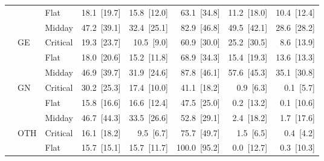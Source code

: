 \begin{tabular}{l l l r r r r r}
 &  & Flat & 18.1~{\color{seasoncol}\scriptsize[19.7]} & 15.8~{\color{seasoncol}\scriptsize[12.0]} & 63.1~{\color{seasoncol}\scriptsize[34.8]} & 11.2~{\color{seasoncol}\scriptsize[18.0]} & 10.4~{\color{seasoncol}\scriptsize[12.4]} \\
 &  & Midday & 47.2~{\color{seasoncol}\scriptsize[39.1]} & 32.4~{\color{seasoncol}\scriptsize[25.1]} & 82.9~{\color{seasoncol}\scriptsize[46.8]} & 49.5~{\color{seasoncol}\scriptsize[42.1]} & 28.6~{\color{seasoncol}\scriptsize[28.2]} \\
 & GE & Critical & 19.3~{\color{seasoncol}\scriptsize[23.7]} & 10.5~{\color{seasoncol}\scriptsize[9.0]} & 60.9~{\color{seasoncol}\scriptsize[30.0]} & 25.2~{\color{seasoncol}\scriptsize[30.5]} & 8.6~{\color{seasoncol}\scriptsize[13.9]} \\
 &  & Flat & 18.0~{\color{seasoncol}\scriptsize[20.6]} & 15.2~{\color{seasoncol}\scriptsize[11.8]} & 68.9~{\color{seasoncol}\scriptsize[34.3]} & 15.4~{\color{seasoncol}\scriptsize[19.3]} & 13.6~{\color{seasoncol}\scriptsize[13.3]} \\
 &  & Midday & 46.9~{\color{seasoncol}\scriptsize[39.7]} & 31.9~{\color{seasoncol}\scriptsize[24.6]} & 87.8~{\color{seasoncol}\scriptsize[46.1]} & 57.6~{\color{seasoncol}\scriptsize[45.3]} & 35.1~{\color{seasoncol}\scriptsize[30.8]} \\
 & GN & Critical & 30.2~{\color{seasoncol}\scriptsize[25.3]} & 17.4~{\color{seasoncol}\scriptsize[10.0]} & 41.1~{\color{seasoncol}\scriptsize[18.2]} & 0.9~{\color{seasoncol}\scriptsize[6.3]} & 0.1~{\color{seasoncol}\scriptsize[5.7]} \\
 &  & Flat & 15.8~{\color{seasoncol}\scriptsize[16.6]} & 16.6~{\color{seasoncol}\scriptsize[12.4]} & 47.5~{\color{seasoncol}\scriptsize[25.0]} & 0.2~{\color{seasoncol}\scriptsize[13.2]} & 0.1~{\color{seasoncol}\scriptsize[10.6]} \\
 &  & Midday & 46.7~{\color{seasoncol}\scriptsize[44.3]} & 33.5~{\color{seasoncol}\scriptsize[26.6]} & 52.8~{\color{seasoncol}\scriptsize[29.1]} & 2.4~{\color{seasoncol}\scriptsize[18.2]} & 1.7~{\color{seasoncol}\scriptsize[17.6]} \\
 & OTH & Critical & 16.1~{\color{seasoncol}\scriptsize[18.2]} & 9.5~{\color{seasoncol}\scriptsize[6.7]} & 75.7~{\color{seasoncol}\scriptsize[49.7]} & 1.5~{\color{seasoncol}\scriptsize[6.5]} & 0.4~{\color{seasoncol}\scriptsize[4.2]} \\
 &  & Flat & 15.7~{\color{seasoncol}\scriptsize[15.1]} & 15.7~{\color{seasoncol}\scriptsize[11.7]} & 100.0~{\color{seasoncol}\scriptsize[95.2]} & 0.0~{\color{seasoncol}\scriptsize[12.7]} & 0.3~{\color{seasoncol}\scriptsize[10.3]} \\

\end{tabular}
